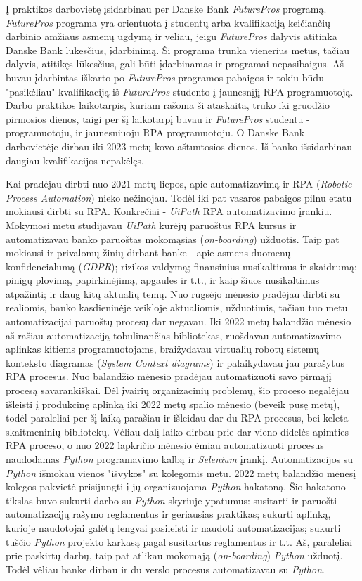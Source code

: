\documentclass{VUMIFPSBakPrakAt}
\begin{document}
\par
Į praktikos darbovietę įsidarbinau per Danske Bank \textit{FuturePros} programą. \textit{FuturePros} programa yra orientuota į studentų arba kvalifikaciją keičiančių darbinio amžiaus asmenų ugdymą ir vėliau, jeigu \textit{FuturePros} dalyvis atitinka Danske Bank lūkesčius, įdarbinimą. Ši programa trunka vienerius metus, tačiau dalyvis, atitikęs lūkesčius, gali būti įdarbinamas ir programai nepasibaigus. Aš buvau įdarbintas iškarto po \textit{FuturePros} programos pabaigos ir tokiu būdu "pasikėliau" kvalifikaciją iš \textit{FuturePros} studento į jaunesnįjį RPA programuotoją. Darbo praktikos laikotarpis, kuriam rašoma ši ataskaita, truko iki gruodžio pirmosios dienos, taigi per šį laikotarpį buvau ir \textit{FuturePros} studentu - programuotoju, ir jaunesniuoju RPA programuotoju. O Danske Bank darbovietėje dirbau iki 2023 metų kovo aštuntosios dienos. Iš banko išsidarbinau daugiau kvalifikacijos nepakėlęs.
\par
Kai pradėjau dirbti nuo 2021 metų liepos, apie automatizavimą ir RPA (\textit{Robotic Process Automation}) nieko nežinojau. Todėl iki pat vasaros pabaigos pilnu etatu mokiausi dirbti su RPA. Konkrečiai - \textit{UiPath} RPA automatizavimo įrankiu. Mokymosi metu studijavau \textit{UiPath} kūrėjų paruoštus RPA kursus ir automatizavau banko paruoštas mokomąsias (\textit{on-boarding}) užduotis. Taip pat mokiausi ir privalomų žinių dirbant banke - apie asmens duomenų konfidencialumą (\textit{GDPR}); rizikos valdymą; finansinius nusikaltimus ir skaidrumą: pinigų plovimą, papirkinėjimą, apgaules ir t.t., ir kaip šiuos nusikaltimus atpažinti; ir daug kitų aktualių temų. Nuo rugsėjo mėnesio pradėjau dirbti su realiomis, banko kasdieninėje veikloje aktualiomis, užduotimis, tačiau tuo metu automatizacijai paruoštų procesų dar negavau. Iki 2022 metų balandžio mėnesio aš rašiau automatizaciją tobulinančias bibliotekas, ruošdavau automatizavimo aplinkas kitiems programuotojams, braižydavau virtualių robotų sistemų konteksto diagramas (\textit{System Context diagrams}) ir palaikydavau jau parašytus RPA procesus. Nuo balandžio mėnesio pradėjau automatizuoti savo pirmąjį procesą savarankiškai. Dėl įvairių organizacinių problemų, šio proceso negalėjau išleisti į produkcinę aplinką iki 2022 metų spalio mėnesio (beveik pusę metų), todėl paraleliai per šį laiką parašiau ir išleidau dar du RPA procesus, bei keleta skaitmeninių bibliotekų. Vėliau dalį laiko dirbau prie dar vieno didelės apimties RPA proceso, o nuo 2022 lapkričio mėnesio ėmiau automatizuoti procesus naudodamas \textit{Python} programavimo kalbą ir \textit{Selenium} įrankį. Automatizacijos su \textit{Python} išmokau vienos "išvykos" su kolegomis metu. 2022 metų balandžio mėnesį kolegos pakvietė prisijungti į jų organizuojama \textit{Python} hakatoną. Šio hakatono tikslas buvo sukurti darbo su \textit{Python} skyriuje ypatumus: susitarti ir paruošti automatizacijų rašymo reglamentus ir geriausias praktikas; sukurti aplinką, kurioje naudotojai galėtų lengvai pasileisti ir naudoti automatizacijas; sukurti tuščio \textit{Python} projekto karkasą pagal susitartus reglamentus ir t.t. Aš, paraleliai prie paskirtų darbų, taip pat atlikau mokomąją (\textit{on-boarding}) \textit{Python} užduotį. Todėl vėliau banke dirbau ir du verslo procesus automatizavau su \textit{Python}.
\end{document}
